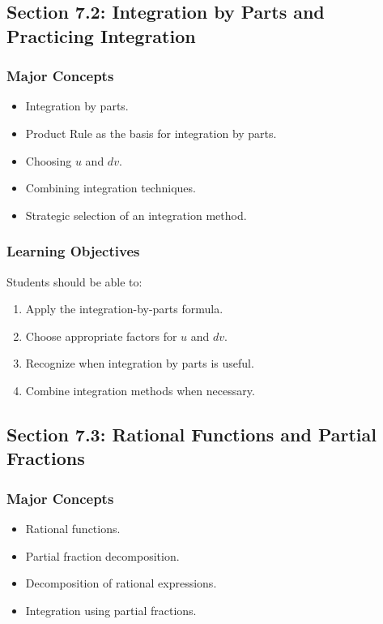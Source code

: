 \documentclass[11pt]{article}
\begin{document}
\subsection{Section 7.2: Integration by Parts and Practicing Integration}

\subsubsection{Major Concepts}

\begin{itemize}
    \item Integration by parts.
    \item Product Rule as the basis for integration by parts.
    \item Choosing $u$ and $dv$.
    \item Combining integration techniques.
    \item Strategic selection of an integration method.
\end{itemize}

\subsubsection{Learning Objectives}

Students should be able to:

\begin{enumerate}
    \item Apply the integration-by-parts formula.
    \item Choose appropriate factors for $u$ and $dv$.
    \item Recognize when integration by parts is useful.
    \item Combine integration methods when necessary.
\end{enumerate}

\subsection{Section 7.3: Rational Functions and Partial Fractions}

\subsubsection{Major Concepts}

\begin{itemize}
    \item Rational functions.
    \item Partial fraction decomposition.
    \item Decomposition of rational expressions.
    \item Integration using partial fractions.
\end{itemize}
\end{document}
